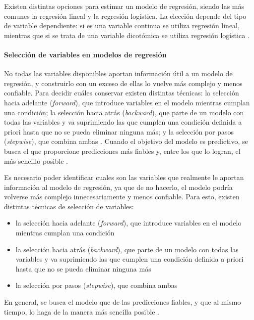     Existen distintas opciones para estimar un modelo de regresión, siendo las más comunes la regresión lineal y la regresión logística. La elección depende del tipo de variable dependiente: si es una variable continua se utiliza regresión lineal, mientras que si se trata de una variable dicotómica se utiliza regresión logística \cite{pelaez2016modelos}.

    \paragraph{Selección de variables en modelos de regresión}    %
    No todas las variables disponibles aportan información útil a un modelo de regresión, y construirlo con un exceso de ellas lo vuelve más complejo y menos confiable. Para decidir cuáles conservar existen distintas técnicas: la selección hacia adelante (\textit{forward}), que introduce variables en el modelo mientras cumplan una condición; la selección hacia atrás (\textit{backward}), que parte de un modelo con todas las variables y va suprimiendo las que cumplen una condición definida a priori hasta que no se pueda eliminar ninguna más; y la selección por pasos (\textit{stepwise}), que combina ambas \cite{pelaez2016modelos}. Cuando el objetivo del modelo es predictivo, se busca el que proporcione predicciones más fiables y, entre los que lo logran, el más sencillo posible \cite{pelaez2016modelos}.

    Es necesario poder identificar cuales son las variables que realmente le aportan información al modelo de regresión, ya que de no hacerlo, el modelo podría volverse más complejo innecesariamente y menos confiable. Para esto, existen distintas técnicas de selección de variables: 
    
    \begin{itemize}
        \item la selección hacia adelante (\textit{forward}), que introduce variables en el modelo mientras cumplan una condición
        \item la selección hacia atrás (\textit{backward}), que parte de un modelo con todas las variables y va suprimiendo las que cumplen una condición definida a priori hasta que no se pueda eliminar ninguna más
        \item la selección por pasos (\textit{stepwise}), que combina ambas \cite{pelaez2016modelos}
    \end{itemize}
    
    En general, se busca el modelo que de las predicciones fiables, y que al mismo tiempo, lo haga de la manera más sencilla posible \cite{pelaez2016modelos}. 

